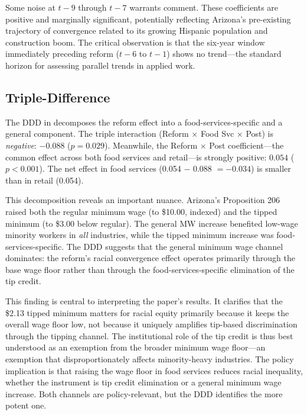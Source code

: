 \documentclass[12pt]{article}
\begin{document}
Some noise at $t-9$ through $t-7$ warrants comment. These coefficients are positive and marginally significant, potentially reflecting Arizona's pre-existing trajectory of convergence related to its growing Hispanic population and construction boom. The critical observation is that the six-year window immediately preceding reform ($t-6$ to $t-1$) shows no trend---the standard horizon for assessing parallel trends in applied work.

\subsection{Triple-Difference}



The DDD in  decomposes the reform effect into a food-services-specific and a general component. The triple interaction (Reform $\times$ Food Svc $\times$ Post) is \textit{negative}: $-0.088$ ($p = 0.029$). Meanwhile, the Reform $\times$ Post coefficient---the common effect across both food services and retail---is strongly positive: $0.054$ ($p < 0.001$). The net effect in food services (0.054 $-$ 0.088 $= -0.034$) is smaller than in retail (0.054).

This decomposition reveals an important nuance. Arizona's Proposition 206 raised both the regular minimum wage (to \$10.00, indexed) and the tipped minimum (to \$3.00 below regular). The general MW increase benefited low-wage minority workers in \textit{all} industries, while the tipped minimum increase was food-services-specific. The DDD suggests that the general minimum wage channel dominates: the reform's racial convergence effect operates primarily through the base wage floor rather than through the food-services-specific elimination of the tip credit.

This finding is central to interpreting the paper's results. It clarifies that the \$2.13 tipped minimum matters for racial equity primarily because it keeps the overall wage floor low, not because it uniquely amplifies tip-based discrimination through the tipping channel. The institutional role of the tip credit is thus best understood as an exemption from the broader minimum wage floor---an exemption that disproportionately affects minority-heavy industries. The policy implication is that raising the wage floor in food services reduces racial inequality, whether the instrument is tip credit elimination or a general minimum wage increase. Both channels are policy-relevant, but the DDD identifies the more potent one.
\end{document}
